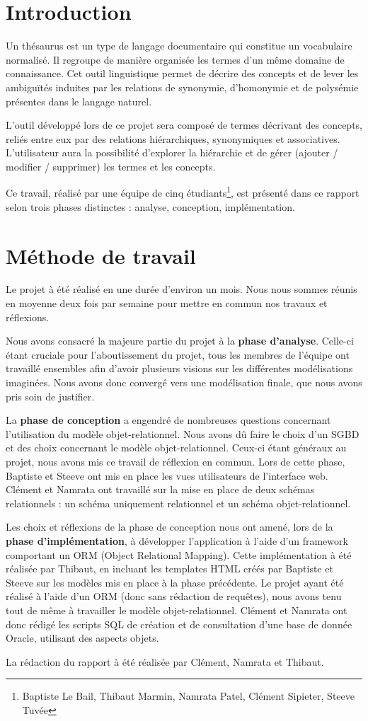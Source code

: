 \chapter*{Introduction}
Un thésaurus est un type de langage documentaire qui constitue un vocabulaire normalisé. Il regroupe de manière organisée les termes d'un même domaine de connaissance. Cet outil linguistique permet de décrire des concepts et de lever les ambiguïtés induites par les relations de synonymie, d'homonymie et de polysémie présentes dans le langage naturel.

L'outil développé lors de ce projet sera composé de termes décrivant des concepts, reliés entre eux par des relations hiérarchiques, synonymiques et associatives. L'utilisateur aura la possibilité d'explorer la hiérarchie et de gérer (ajouter / modifier / supprimer) les termes et les concepts.

Ce travail, réalisé par une équipe de cinq étudiants\footnote{Baptiste Le Bail, Thibaut Marmin, Namrata Patel, Clément Sipieter, Steeve Tuvée}, est présenté dans ce rapport selon trois phases distinctes : analyse, conception, implémentation.
\clearemptydoublepage
\chapter*{Méthode de travail}

Le projet à été réalisé en une durée d'environ un mois. Nous nous sommes réunis en moyenne deux fois par semaine pour mettre en commun nos travaux et réflexions.

Nous avons consacré la majeure partie du projet à la \textbf{phase d'analyse}. Celle-ci étant cruciale pour l'aboutissement du projet, tous les membres de l'équipe ont travaillé ensembles afin d'avoir plusieurs visions sur les différentes modélisations imaginées. Nous avons donc convergé vers une modélisation finale, que nous avons pris soin de justifier.

La \textbf{phase de conception} a engendré de nombreuses questions concernant l'utilisation du modèle objet-relationnel. Nous avons dû faire le choix d'un SGBD et des choix concernant le modèle objet-relationnel. Ceux-ci étant généraux au projet, nous avons mis ce travail de réflexion en commun. Lors de cette phase, Baptiste et Steeve ont mis en place les vues utilisateurs de l'interface web. Clément et Namrata ont travaillé sur la mise en place de deux schémas relationnels : un schéma uniquement relationnel et un schéma objet-relationnel.

Les choix et réflexions de la phase de conception nous ont amené, lors de la \textbf{phase d'implémentation}, à développer l'application à l'aide d'un framework comportant un ORM (Object Relational Mapping). Cette implémentation à été réalisée par Thibaut, en incluant les templates HTML créés par Baptiste et Steeve sur les modèles mis en place à la phase précédente. Le projet ayant été réalisé à l'aide d'un ORM (donc sans rédaction de requêtes), nous avons tenu tout de même à travailler le modèle objet-relationnel. Clément et Namrata ont donc rédigé les scripts SQL de création et de consultation d'une base de donnée Oracle, utilisant des aspects objets.

La rédaction du rapport à été réalisée par Clément, Namrata et Thibaut.
